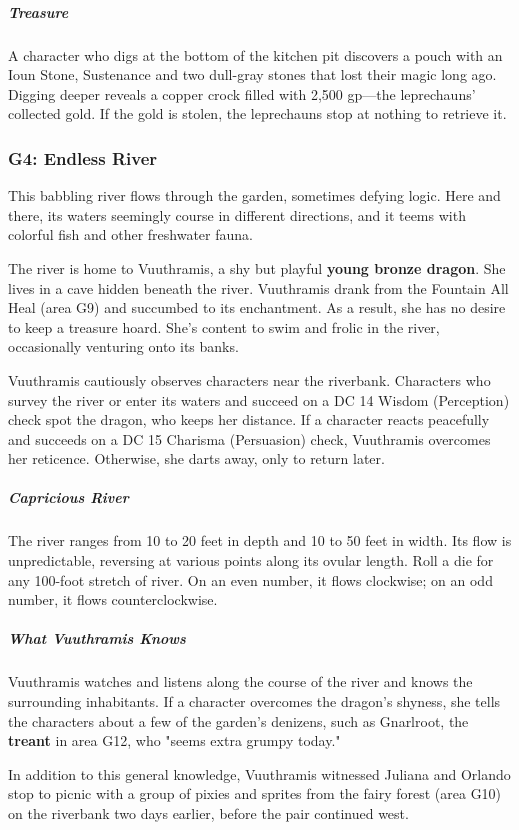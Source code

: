 \documentclass[10pt,a4paper,twoside,bg=print,twocolumn,openany,nodeprecatedcode]{dndbook}
\begin{document}
\subparagraph{Treasure}
A character who digs at the bottom of the kitchen pit discovers a pouch with an Ioun Stone, Sustenance and two dull-gray stones that lost their magic long ago. Digging deeper reveals a copper crock filled with 2,500 gp—the leprechauns' collected gold. If the gold is stolen, the leprechauns stop at nothing to retrieve it.

\subsubsection{G4: Endless River}
\begin{DndReadAloud}{}
This babbling river flows through the garden, sometimes defying logic. Here and there, its waters seemingly course in different directions, and it teems with colorful fish and other freshwater fauna.

\end{DndReadAloud}

The river is home to Vuuthramis, a shy but playful \textbf{young bronze dragon}. She lives in a cave hidden beneath the river. Vuuthramis drank from the Fountain All Heal (area G9) and succumbed to its enchantment. As a result, she has no desire to keep a treasure hoard. She's content to swim and frolic in the river, occasionally venturing onto its banks.

Vuuthramis cautiously observes characters near the riverbank. Characters who survey the river or enter its waters and succeed on a DC 14 Wisdom (Perception) check spot the dragon, who keeps her distance. If a character reacts peacefully and succeeds on a DC 15 Charisma (Persuasion) check, Vuuthramis overcomes her reticence. Otherwise, she darts away, only to return later.

\subparagraph{Capricious River}
The river ranges from 10 to 20 feet in depth and 10 to 50 feet in width. Its flow is unpredictable, reversing at various points along its ovular length. Roll a die for any 100-foot stretch of river. On an even number, it flows clockwise; on an odd number, it flows counterclockwise.

\subparagraph{What Vuuthramis Knows}
Vuuthramis watches and listens along the course of the river and knows the surrounding inhabitants. If a character overcomes the dragon's shyness, she tells the characters about a few of the garden's denizens, such as Gnarlroot, the \textbf{treant} in area G12, who "seems extra grumpy today."

In addition to this general knowledge, Vuuthramis witnessed Juliana and Orlando stop to picnic with a group of pixies and sprites from the fairy forest (area G10) on the riverbank two days earlier, before the pair continued west.
\end{document}
